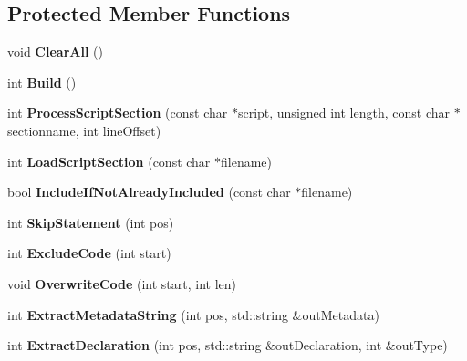 \subsection*{Protected Member Functions}
\begin{DoxyCompactItemize}
\item 
\mbox{\label{class_c_script_builder_ad234fac4f6f2245f0d187d1d8c840e88}} 
void {\bfseries Clear\+All} ()
\item 
\mbox{\label{class_c_script_builder_a28c0ece1322c4c30e9bc1f363d01dfc5}} 
int {\bfseries Build} ()
\item 
\mbox{\label{class_c_script_builder_a55d0a20616ed860dbc449f6bd9612e85}} 
int {\bfseries Process\+Script\+Section} (const char $\ast$script, unsigned int length, const char $\ast$sectionname, int line\+Offset)
\item 
\mbox{\label{class_c_script_builder_a9e9b1be2409e79ad73908422561397a3}} 
int {\bfseries Load\+Script\+Section} (const char $\ast$filename)
\item 
\mbox{\label{class_c_script_builder_a395b2129be42ee9f8935556babba5782}} 
bool {\bfseries Include\+If\+Not\+Already\+Included} (const char $\ast$filename)
\item 
\mbox{\label{class_c_script_builder_a28c1dbb2929fe0848e740354e59ae3c0}} 
int {\bfseries Skip\+Statement} (int pos)
\item 
\mbox{\label{class_c_script_builder_ac89afeb792d4dd2a06d0a6eb5eb82aeb}} 
int {\bfseries Exclude\+Code} (int start)
\item 
\mbox{\label{class_c_script_builder_ae744620b788b3bd86671cb60a983a3c8}} 
void {\bfseries Overwrite\+Code} (int start, int len)
\item 
\mbox{\label{class_c_script_builder_aaaa4e5144b6bfbcac593d2eb746d2d46}} 
int {\bfseries Extract\+Metadata\+String} (int pos, std\+::string \&out\+Metadata)
\item 
\mbox{\label{class_c_script_builder_a786ded143d81b196ac7b9d4d02a4e030}} 
int {\bfseries Extract\+Declaration} (int pos, std\+::string \&out\+Declaration, int \&out\+Type)
\end{DoxyCompactItemize}
